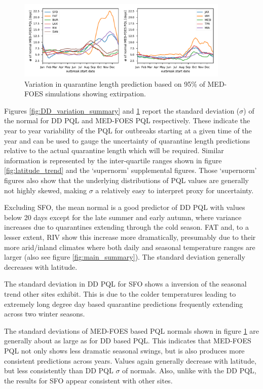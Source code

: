 \documentclass[10pt,a4paper,twocolumn]{article}
\begin{document}
\begin{figure}[ht!]
\centering
\includegraphics[width=0.9\textwidth]{figs/fig_pe95_variation.pdf}
\caption{\label{fig:pe95_variation_summary}Variation in quarantine length prediction 
based on 95\% of MED-FOES simulations showing extirpation.}
\end{figure}


Figures \ref{fig:DD_variation_summary} and \ref{fig:pe95_variation_summary}
report the standard deviation ($\sigma$) of the normal for DD PQL and MED-FOES PQL 
respectively.
These indicate the year to year variability of the PQL for outbreaks starting at a
given time of the year and can be used to gauge the uncertainty of quarantine 
length predictions relative to the actual quarantine length which will be required.
Similar information is represented by the inter-quartile ranges 
shown in figure \ref{fig:latitude_trend} and the `supernorm' supplemental figures.
Those `supernorm' figures also show that the underlying distributions of PQL 
values are generally not highly skewed, making $\sigma$ a relatively easy to interpret 
proxy for uncertainty.

Excluding SFO, the mean normal is a good predictor of DD PQL with values below 20 days
except for the late summer and early autumn, where variance increases 
due to quarantines extending through the cold season.
FAT and, to a lesser extent, RIV show this increase more dramatically, presumably due to their more 
arid/inland climates where both daily and seasonal temperature ranges are larger
(also see figure \ref{fig:main_summary}).
The standard deviation generally decreases with latitude.

The standard deviation in DD PQL for SFO shows a inversion of the seasonal trend 
other sites exhibit.
This is due to the colder temperatures leading to extremely long degree day based 
quarantine predictions frequently extending across two winter seasons.

The standard deviations of MED-FOES based PQL normals 
shown in figure \ref{fig:pe95_variation_summary}
are generally about  as large as for DD based PQL.
This indicates that MED-FOES PQL not only shows less dramatic seasonal swings, 
but is also produces more consistent predictions across years.
Values again generally decrease with latitude, but less consistently than DD PQL $\sigma$ of normals.
Also, unlike with the DD PQL, the results for SFO appear consistent with other sites.
\end{document}
